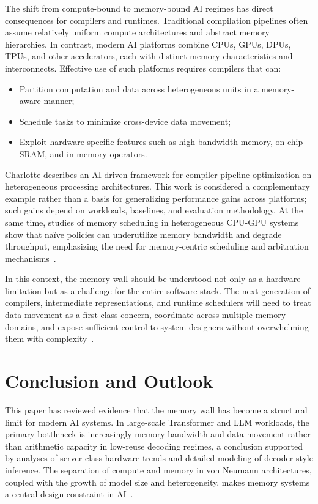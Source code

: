 \documentclass[conference]{IEEEtran}
\begin{document}
The shift from compute-bound to memory-bound AI regimes has direct consequences for compilers and runtimes. Traditional compilation pipelines often assume relatively uniform compute architectures and abstract memory hierarchies. In contrast, modern AI platforms combine CPUs, GPUs, DPUs, TPUs, and other accelerators, each with distinct memory characteristics and interconnects. Effective use of such platforms requires compilers that can:
\begin{itemize}
    \item Partition computation and data across heterogeneous units in a memory-aware manner;
    \item Schedule tasks to minimize cross-device data movement;
    \item Exploit hardware-specific features such as high-bandwidth memory, on-chip SRAM, and in-memory operators.
\end{itemize}

Charlotte describes an AI-driven framework for compiler-pipeline optimization on heterogeneous processing architectures. This work is considered a complementary example rather than a basis for generalizing performance gains across platforms; such gains depend on workloads, baselines, and evaluation methodology. At the same time, studies of memory scheduling in heterogeneous CPU-GPU systems show that naïve policies can underutilize memory bandwidth and degrade throughput, emphasizing the need for memory-centric scheduling and arbitration mechanisms~\cite{wang2014memory,charlotte2024compiler}.

In this context, the memory wall should be understood not only as a hardware limitation but as a challenge for the entire software stack. The next generation of compilers, intermediate representations, and runtime schedulers will need to treat data movement as a first-class concern, coordinate across multiple memory domains, and expose sufficient control to system designers without overwhelming them with complexity~\cite{gholami2024ai,wang2014memory,charlotte2024compiler}.

\section{Conclusion and Outlook}
\label{sec:conclusion}

This paper has reviewed evidence that the memory wall has become a structural limit for modern AI systems. In large-scale Transformer and LLM workloads, the primary bottleneck is increasingly memory bandwidth and data movement rather than arithmetic capacity in low-reuse decoding regimes, a conclusion supported by analyses of server-class hardware trends and detailed modeling of decoder-style inference. The separation of compute and memory in von Neumann architectures, coupled with the growth of model size and heterogeneity, makes memory systems a central design constraint in AI~\cite{gholami2024ai,roy2025breaking}.
\end{document}
